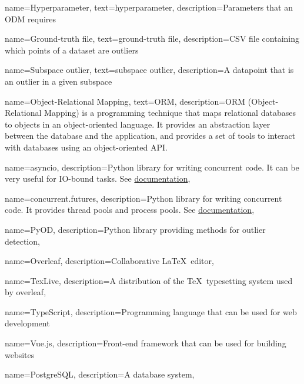 {
    name={Hyperparameter},
    text={hyperparameter},
    description={Parameters that an \gls*{ODM} requires}
}

{
    name={Ground-truth file},
    text={ground-truth file},
    description={\gls*{CSV} file containing which points of a dataset are outliers}
}

{
    name={Subspace outlier},
    text={subspace outlier},
    description={A datapoint that is an outlier in a given \gls*{subspace}}
}

{
    name={Object-Relational Mapping},
    text={ORM},
    description={ORM (Object-Relational Mapping) is a programming technique that maps relational databases to objects in an object-oriented language. It provides an abstraction layer between the database and the application, and provides a set of tools to interact with databases using an object-oriented API.}
}


{
    name={asyncio},
    description={Python library for writing concurrent code. It can be very useful for IO-bound tasks. See \href{https://docs.python.org/3/library/asyncio.html}{documentation}},
}

{
    name={concurrent.futures},
    description={Python library for writing concurrent code. It provides thread pools and process pools. See \href{https://docs.python.org/3/library/concurrent.futures.html}{documentation}},
}

{
    name={PyOD},
    description={Python library providing methods for outlier detection},
}

{
    name={Overleaf},
    description={Collaborative \LaTeX\ editor},
}

{
    name={TexLive},
    description={A distribution of the \TeX\ typesetting system used by \gls*{overleaf}},
}

{
    name={TypeScript},
    description={Programming language that can be used for web development}
}

{
    name={Vue.js},
    description={Front-end framework that can be used for building websites}
}

{
    name={PostgreSQL},
    description={A database system},
}

